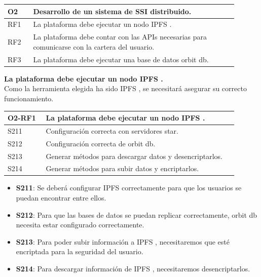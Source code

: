 \newpage
\begin{center}
    \begin{table}[h!]
        \begin{tabular}{|p{0.1\linewidth} | p{0.8\linewidth}|}
            \hline
            \rowcolor{Gray} 
            \textbf{O2} & \textbf{Desarrollo de un sistema de SSI distribuido.} \\
            \hline
            RF1     & La plataforma debe ejecutar un nodo IPFS \cite{web:ipfs}. \\
            \hline
            RF2     & La plataforma debe contar con las APIs necesarias para comunicarse con la cartera del usuario.\\
            \hline
            RF3     & La plataforma debe ejecutar una base de datos orbit db. \\
            \hline
        \end{tabular}
    \end{table}
\end{center}
\textbf{La plataforma debe ejecutar un nodo IPFS \cite{web:ipfs}.}\\
Como la herramienta elegida ha sido IPFS \cite{web:ipfs}, se necesitará asegurar su correcto funcionamiento.
\begin{center}
    \begin{table}[h!]
        \begin{tabular}{|p{0.15\linewidth} | p{0.75\linewidth}|}
            \hline
            \rowcolor{Gray} 
            \textbf{O2-RF1} & \textbf{La plataforma debe ejecutar un nodo IPFS \cite{web:ipfs}.} \\
            \hline
            S211     & Configuración correcta con servidores star. \\
            \hline
            S212     & Configuración correcta de orbit db. \\
            \hline
            S213     & Generar métodos para descargar datos y desencriptarlos. \\
            \hline
            S214     & Generar métodos para subir datos y encriptarlos. \\
            \hline
        \end{tabular}
    \end{table}
\end{center}
\begin{itemize}
    \item \textbf{S211}: Se deberá configurar IPFS \cite{web:ipfs} correctamente para que los usuarios se puedan encontrar entre ellos.
    \item \textbf{S212}: Para que las bases de datos se puedan replicar correctamente, orbit db necesita estar configurado correctamente.
    \item \textbf{S213}: Para poder subir información a IPFS \cite{web:ipfs}, necesitaremos que esté encriptada para la seguridad del usuario.
    \item \textbf{S214}: Para descargar información de IPFS \cite{web:ipfs}, necesitaremos desencriptarlos.
\end{itemize}
